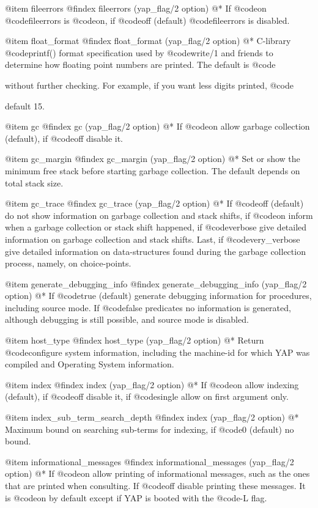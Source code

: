 {{{{{{@item  fileerrors
@findex fileerrors (yap_flag/2 option)
@*
If @code{on} @code{fileerrors} is @code{on}, if @code{off} (default)
@code{fileerrors} is disabled.

@item float_format
@findex float_format (yap_flag/2 option)
@* C-library @code{printf()} format specification used by @code{write/1} and
friends to determine how floating point numbers are printed. The
default is @code{%
without further checking. For example, if you want less digits
printed, @code{%
default 15.

@item  gc
@findex gc (yap_flag/2 option)
@*
If @code{on} allow garbage collection (default), if @code{off} disable it.

@item  gc_margin
@findex gc_margin (yap_flag/2 option)
@*
Set or show the minimum free stack before starting garbage
collection. The default depends on total stack size. 

@item  gc_trace
@findex gc_trace (yap_flag/2 option)
@* If @code{off} (default) do not show information on garbage collection
and stack shifts, if @code{on} inform when a garbage collection or stack
shift happened, if @code{verbose} give detailed information on garbage
collection and stack shifts. Last, if @code{very_verbose} give detailed
information on data-structures found during the garbage collection
process, namely, on choice-points.

@item  generate_debugging_info
@findex generate_debugging_info (yap_flag/2 option)
@* If @code{true} (default) generate debugging information for
procedures, including source mode. If @code{false} predicates no
information is generated, although debugging is still possible, and
source mode is disabled.

@item  host_type
@findex host_type (yap_flag/2 option)
@* Return @code{configure} system information, including the machine-id
for which YAP was compiled and Operating System information. 

@item  index
@findex index (yap_flag/2 option)
@* If @code{on} allow indexing (default), if @code{off} disable it, if
@code{single} allow on first argument only.

@item  index_sub_term_search_depth
@findex index (yap_flag/2 option)
@*
Maximum bound on searching sub-terms for indexing, if @code{0} (default) no bound.

@item  informational_messages
@findex informational_messages (yap_flag/2 option)
@*
If @code{on} allow printing of informational messages, such as the ones
that are printed when consulting. If @code{off} disable printing
these messages. It is @code{on} by default except if YAP is booted with
the @code{-L} flag.

}}}}}}}}

